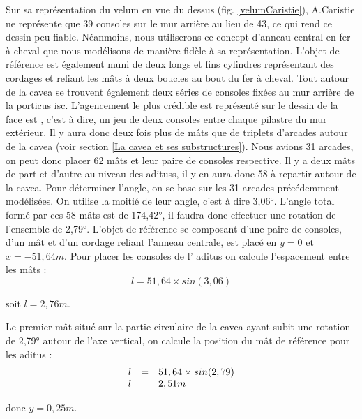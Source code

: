 Sur sa représentation du \gls{velum} en vue du dessus  (fig. \ref{velumCaristie}), A.Caristie ne représente que 39 consoles sur le mur arrière au lieu de 43, ce qui rend ce dessin peu fiable. Néanmoins, nous utiliserons ce concept d'anneau central en fer à cheval que nous modélisons de manière fidèle à sa représentation. L'objet de référence est également muni de deux longs et fins cylindres représentant des cordages et reliant les mâts à deux boucles au bout du fer à cheval.
Tout autour de la \gls{cavea} se trouvent également deux séries de consoles fixées au mur arrière de la \gls{porticus isc}. L'agencement le plus crédible est représenté sur le dessin de la face est \cite[Pl. IV]{orangePl}, c'est à dire, un jeu de deux consoles entre chaque \gls{pilastre} du mur extérieur. Il y aura donc deux fois plus de mâts que de triplets d'arcades autour de la \gls{cavea} (voir section \ref{La cavea et ses substructures}). Nous avions 31 arcades, on peut donc placer 62 mâts et leur paire de consoles respective. Il y a deux mâts de part et d'autre au niveau des \glspl{aditus}, il y en aura donc 58 à repartir autour de la \gls{cavea}. Pour déterminer l'angle, on se base sur les 31 arcades précédemment modélisées. On utilise la moitié de leur angle, c'est à dire 3,06°. L'angle total formé par ces 58 mâts est de 174,42°, il faudra donc effectuer une rotation de l'ensemble de 2,79°. L'objet de référence se composant d'une paire de consoles, d'un mât et d'un cordage reliant l'anneau centrale, est placé en $y=0$ et $x=-51,64m$. Pour placer les consoles de l' \gls{aditus} on calcule l'espacement entre les mâts :
\begin{equation}
	l =  51,64 \times sin(3,06) 
\end{equation}
\begin{center}
	soit $l = 2,76m$.
\end{center}

Le premier mât situé sur la partie circulaire de la \gls{cavea} ayant subit une rotation de 2,79° autour de l'axe vertical, on calcule la position du mât de référence pour les  \gls{aditus} :
\begin{equation}
	\begin{array}{r c l}
		l & = & 51,64 \times sin(2,79) \\
		l &= & 2,51m
	\end{array}
\end{equation}
\begin{center}
	donc $y = 0,25m$.
\end{center}

